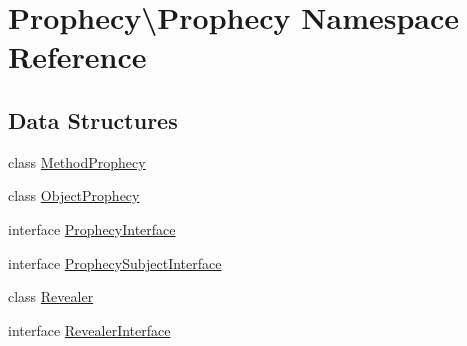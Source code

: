 \hypertarget{namespace_prophecy_1_1_prophecy}{}\section{Prophecy\textbackslash{}Prophecy Namespace Reference}
\label{namespace_prophecy_1_1_prophecy}
\subsection*{Data Structures}
\begin{DoxyCompactItemize}
\item 
class \mbox{\hyperlink{class_prophecy_1_1_prophecy_1_1_method_prophecy}{Method\+Prophecy}}
\item 
class \mbox{\hyperlink{class_prophecy_1_1_prophecy_1_1_object_prophecy}{Object\+Prophecy}}
\item 
interface \mbox{\hyperlink{interface_prophecy_1_1_prophecy_1_1_prophecy_interface}{Prophecy\+Interface}}
\item 
interface \mbox{\hyperlink{interface_prophecy_1_1_prophecy_1_1_prophecy_subject_interface}{Prophecy\+Subject\+Interface}}
\item 
class \mbox{\hyperlink{class_prophecy_1_1_prophecy_1_1_revealer}{Revealer}}
\item 
interface \mbox{\hyperlink{interface_prophecy_1_1_prophecy_1_1_revealer_interface}{Revealer\+Interface}}
\end{DoxyCompactItemize}
